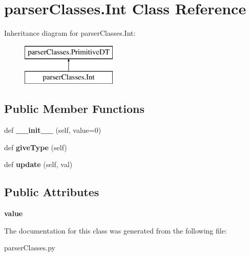 \hypertarget{classparser_classes_1_1_int}{}\section{parser\+Classes.\+Int Class Reference}
\label{classparser_classes_1_1_int}
Inheritance diagram for parser\+Classes.\+Int\+:\begin{figure}[H]
\begin{center}
\leavevmode
\includegraphics[height=2.000000cm]{classparser_classes_1_1_int}
\end{center}
\end{figure}
\subsection*{Public Member Functions}
\begin{DoxyCompactItemize}
\item 
def {\bfseries \+\_\+\+\_\+init\+\_\+\+\_\+} (self, value=0)\hypertarget{classparser_classes_1_1_int_a5f3c93887c93af55258fd75d55f79120}{}\label{classparser_classes_1_1_int_a5f3c93887c93af55258fd75d55f79120}

\item 
def {\bfseries give\+Type} (self)\hypertarget{classparser_classes_1_1_int_afb7baec715a32b42a3365226fd95e8d1}{}\label{classparser_classes_1_1_int_afb7baec715a32b42a3365226fd95e8d1}

\item 
def {\bfseries update} (self, val)\hypertarget{classparser_classes_1_1_int_a0d695c67593f926a8336ba1b3222f9c8}{}\label{classparser_classes_1_1_int_a0d695c67593f926a8336ba1b3222f9c8}

\end{DoxyCompactItemize}
\subsection*{Public Attributes}
\begin{DoxyCompactItemize}
\item 
{\bfseries value}\hypertarget{classparser_classes_1_1_int_a3daf0c4b136a333cb9f496272fffd119}{}\label{classparser_classes_1_1_int_a3daf0c4b136a333cb9f496272fffd119}

\end{DoxyCompactItemize}


The documentation for this class was generated from the following file\+:\begin{DoxyCompactItemize}
\item 
parser\+Classes.\+py\end{DoxyCompactItemize}
